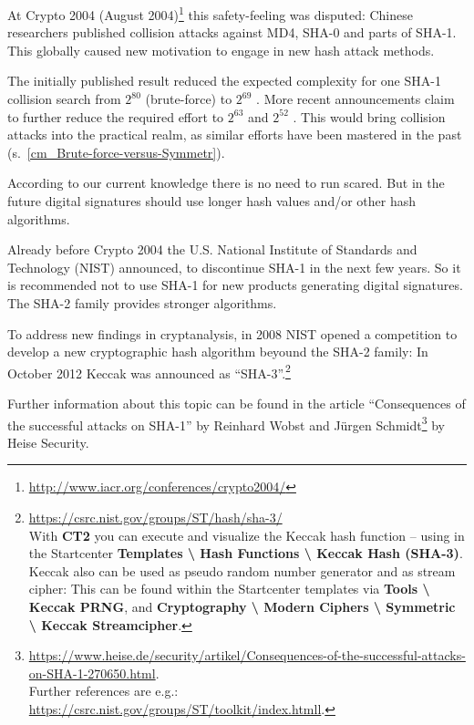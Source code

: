 \begin{bibunit}[babalpha]
At Crypto 2004 (August 2004)\footnote{%
    \url{http://www.iacr.org/conferences/crypto2004/} }
this safety-feeling was disputed: 
Chinese researchers published collision attacks against MD4, SHA-0 and
parts of SHA-1. This globally caused new motivation to engage in
new hash attack methods.

The initially published result reduced the expected complexity for one SHA-1
collision search from $2^{80}$ (brute-force) to $2^{69}$
\cite{Wang2005}. More recent announcements claim to further reduce the required
effort to $2^{63}$ \cite{Wang2005b} and $2^{52}$ \cite{McDonald2009}. This would
bring collision attacks into the practical realm, as similar efforts have been
mastered in the past (s.\ \ref{cm_Brute-force-versus-Symmetr}).


According to our current knowledge there is no need to run scared.
But in the future digital signatures should use longer hash values and/or
other hash algorithms.

Already before Crypto 2004 the U.S. National Institute of Standards and
Technology (NIST) announced, to discontinue SHA-1 in the next few
years. So it is recommended not to use SHA-1 for new products generating digital
signatures. The SHA-2 family \cite{FIPS180} provides stronger algorithms.

To address new findings in cryptanalysis, in 2008 NIST opened a competition to
develop a new cryptographic hash algorithm beyound the SHA-2 family: In October
2012 Keccak was announced as ``SHA-3''.\footnote{%
\url{https://csrc.nist.gov/groups/ST/hash/sha-3/}\\
    With {\bf CT2} you can execute and visualize
    the Keccak hash function -- using in the Startcenter
    {\bf Templates \textbackslash{} Hash Functions \textbackslash{}
    Keccak Hash (SHA-3)}.\\
    Keccak also can be used as pseudo random number generator and as stream
    cipher: This can be found within the Startcenter templates via
    {\bf Tools \textbackslash{} Keccak PRNG}, and 
    {\bf Cryptography \textbackslash{} Modern Ciphers \textbackslash{}
         Symmetric \textbackslash{} Keccak Streamcipher}.
}

Further information about this topic can be found in the article
``Consequences of the successful attacks on SHA-1''
by Reinhard Wobst and J\"urgen Schmidt\footnote{%
      \url{https://www.heise.de/security/artikel/Consequences-of-the-successful-attacks-on-SHA-1-270650.html}.\\
  Further references are e.g.:\\
      \url{https://csrc.nist.gov/groups/ST/toolkit/index.htmll}.
} 
  by Heise Security.





\end{bibunit}
